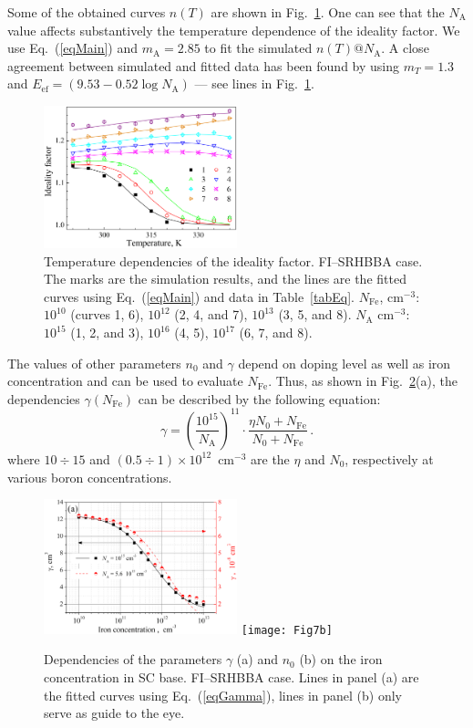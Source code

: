 \documentclass [sort&compress] {elsarticle}
\begin{document}
Some of the obtained curves $n(T)$ are shown in Fig.~\ref{fig6}.
One can see that the $N_\mathrm{A}$ value affects substantively the temperature dependence of the ideality factor.
We use Eq.~(\ref{eqMain})  and $m_\mathrm{A}=2.85$ to fit the simulated $n(T)@ N_\mathrm{A}$.
A close agreement between simulated and fitted data has been found by using $m_T=1.3$ and $E_\mathrm{ef}=(9.53-0.52\log N_\mathrm{A})$ --- see lines in Fig.~\ref{fig6}.

\begin{figure}
\includegraphics[width=0.5\textwidth]{Fig6}%
\caption{\label{fig6}
Temperature dependencies of the ideality factor.
FI--SRHBBA case.
The marks are the simulation results, and the lines are the fitted curves using Eq.~(\ref{eqMain}) and data in Table~\ref{tabEq}.
$N_\mathrm{Fe}$, cm$^{-3}$: $10^{10}$ (curves 1, 6), $10^{12}$ (2, 4, and 7), $10^{13}$ (3, 5, and 8).
$N_\mathrm{A}$ cm$^{-3}$: $10^{15}$ (1, 2, and 3), $10^{16}$ (4,  5), $10^{17}$ (6, 7, and 8).
}%
\end{figure}

The values of other parameters $n_0$ and $\gamma$ depend on doping level as well as iron concentration and can be used to evaluate $N_\mathrm{Fe}$.
Thus, as shown in Fig.~\ref{fig7}(a), the dependencies $\gamma(N_\mathrm{Fe})$ can be described by the following equation:
\begin{equation}
\label{eqGamma}
    \gamma=\left(\frac{10^{15}}{N_\mathrm{A}}\right)^{11}\cdot \frac{\eta N_0+N_\mathrm{Fe}}{N_0+N_\mathrm{Fe}}\,.
\end{equation}
where
$10\div15$ and $(0.5\div1)\times10^{12}$~cm$^{-3}$ are the $\eta$ and $N_0$, respectively at various boron concentrations.


\begin{figure}
\includegraphics[width=0.5\textwidth]{Fig7a}%
\texttt{[image: Fig7b]}
\caption{\label{fig7}
Dependencies of the parameters $\gamma$ (a) and $n_0$ (b) on the iron concentration in SC base.
FI--SRHBBA  case.
Lines in panel (a) are the fitted curves using Eq.~(\ref{eqGamma}), lines in panel (b) only
serve as guide to the eye.
}%
\end{figure}
\end{document}
